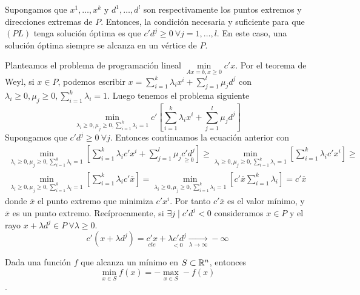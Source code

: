 \documentclass[PM.tex]{subfiles}
\begin{document}
\begin{theorem} Supongamos que $x^1,\dots ,x^k$ y $d^1,\dots ,d^l$ son respectivamente los puntos extremos y direcciones extremas de $P$. Entonces, la condición necesaria y suficiente para que $(PL)$ tenga solución óptima es que $c'd^j\geq 0\ \forall j=1,\dots, l$. En este caso, una solución óptima siempre se alcanza en un vértice de $P$.
\end{theorem}
\begin{dem}
Planteamos el problema de programación lineal $\underset{Ax=b,x\geq 0}{\min} c'x$. Por el teorema de Weyl, si $x\in P$, podemos escribir $x=\sum_{i=1}^k\lambda_ix^i +\sum_{j=1}^l\mu_j d^j$ con $\lambda_i\geq 0, \mu_j\geq 0, \sum_{i=1}^k\lambda_i=1$. Luego tenemos el problema siguiente
\[\underset{\lambda_i\geq 0, \mu_j\geq 0, \sum_{i=1}^k\lambda_i=1}{\min} c'\left[\sum_{i=1}^k\lambda_ix^i +\sum_{j=1}^l\mu_j d^j\right] \]
Supongamos que $c'd^j\geq 0\ \forall j$. Entonces continuamos la ecuación anterior con 
\begin{gather*}
 \underset{\lambda_i\geq 0, \mu_j\geq 0, \sum_{i=1}^k\lambda_i=1}{\min} \left[\sum_{i=1}^k\lambda_ic'x^i +\sum_{j=1}^l\mu_j \underset{\geq 0}{c'd^j}\right]\geq \underset{\lambda_i\geq 0, \mu_j\geq 0, \sum_{i=1}^k\lambda_i=1}{\min} \left[\sum_{i=1}^k\lambda_ic'x^i\right]\geq \\
\underset{\lambda_i\geq 0, \mu_j\geq 0, \sum_{i=1}^k\lambda_i=1}{\min} \left[\sum_{i=1}^k\lambda_ic'\overline{x}\right]= \underset{\lambda_i\geq 0, \mu_j\geq 0, \sum_{i=1}^k\lambda_i=1}{\min} \left[c'\overline{x}\sum_{i=1}^k\lambda_i\right]=c'\overline{x}
\end{gather*}
donde $\overline{x}$ el punto extremo que minimiza $c'x^i$. Por tanto $c'\overline{x}$ es el valor mínimo, y $\overline{x}$ es un punto extremo. Recíprocamente, si $\exists j\mid c'd^j<0$ consideramos $x\in P$ y el rayo $x+\lambda d^j\in P\ \forall\lambda\geq 0$. 
\[ c'(x+\lambda d^j)=\underset{cte}{c'x} + \underset{<0}{\lambda c' d^j}\underset{\lambda\to\infty}{\longrightarrow} -\infty\]
\end{dem}

\begin{nota}
Dada una función $f$ que alcanza un mínimo en $S\subset\mathbb{R}^n$, entonces \[\min_{x\in S} f(x)= -\max_{x\in S}-f(x)\].
\end{nota}
\end{document}
